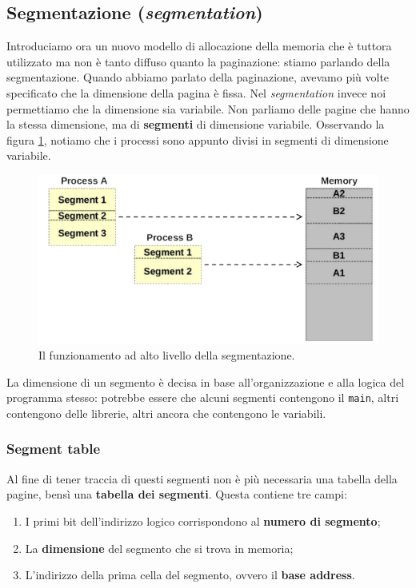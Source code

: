 % 
\subsection{Segmentazione (\textit{segmentation})}
Introduciamo ora un nuovo modello di allocazione della memoria che è tuttora utilizzato ma non è tanto diffuso quanto la paginazione: stiamo parlando della segmentazione. Quando abbiamo parlato della paginazione, avevamo più volte specificato che la dimensione della pagina è fissa. Nel \textit{segmentation} invece noi permettiamo che la dimensione sia variabile. Non parliamo delle pagine che hanno la stessa dimensione, ma di \textbf{segmenti} di dimensione variabile. Osservando la figura \ref{fig:segmentation}, notiamo che i processi sono appunto divisi in segmenti di dimensione variabile.
\begin{figure}[h]
    \centering
    \includegraphics[width = .6\textwidth]{../res/imgs/main memory/segmentation.png}
    \caption{Il funzionamento ad alto livello della segmentazione.}
    \label{fig:segmentation}
\end{figure}
La dimensione di un segmento è decisa in base all'organizzazione e alla logica del programma stesso: potrebbe essere che alcuni segmenti contengono il \texttt{main}, altri contengono delle librerie, altri ancora che contengono le variabili. 

\subsubsection{Segment table}
Al fine di tener traccia di questi segmenti non è più necessaria una tabella della pagine, bensì una \textbf{tabella dei segmenti}. Questa contiene tre campi:
\vspace{-4px}
\begin{enumerate}
\setlength{\itemsep}{-1px}
    \item I primi bit dell'indirizzo logico corrispondono al \textbf{numero di segmento};
    \item La \textbf{dimensione} del segmento che si trova in memoria;
    \item L'indirizzo della prima cella del segmento, ovvero il \textbf{base address}.
\end{enumerate}

